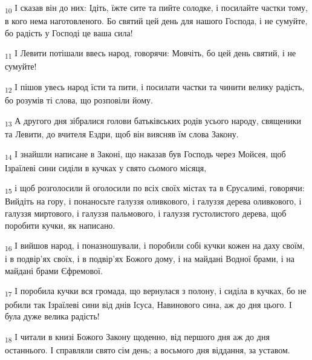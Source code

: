 \begin{tcolorbox}
\textsubscript{10} І сказав він до них: Ідіть, їжте сите та пийте солодке, і посилайте частки тому, в кого нема наготовленого. Бо святий цей день для нашого Господа, і не сумуйте, бо радість у Господі це ваша сила!
\end{tcolorbox}
\begin{tcolorbox}
\textsubscript{11} І Левити потішали ввесь народ, говорячи: Мовчіть, бо цей день святий, і не сумуйте!
\end{tcolorbox}
\begin{tcolorbox}
\textsubscript{12} І пішов увесь народ їсти та пити, і посилати частки та чинити велику радість, бо розумів ті слова, що розповіли йому.
\end{tcolorbox}
\begin{tcolorbox}
\textsubscript{13} А другого дня зібралися голови батьківських родів усього народу, священики та Левити, до вчителя Ездри, щоб він виясняв їм слова Закону.
\end{tcolorbox}
\begin{tcolorbox}
\textsubscript{14} І знайшли написане в Законі, що наказав був Господь через Мойсея, щоб Ізраїлеві сини сиділи в кучках у свято сьомого місяця,
\end{tcolorbox}
\begin{tcolorbox}
\textsubscript{15} і щоб розголосили й оголосили по всіх своїх містах та в Єрусалимі, говорячи: Вийдіть на гору, і понаносьте галуззя оливкового, і галуззя дерева оливкового, і галуззя миртового, і галуззя пальмового, і галуззя густолистого дерева, щоб поробити кучки, як написано.
\end{tcolorbox}
\begin{tcolorbox}
\textsubscript{16} І вийшов народ, і поназношували, і поробили собі кучки кожен на даху своїм, і в подвір'ях своїх, і в подвір'ях Божого дому, і на майдані Водної брами, і на майдані брами Єфремової.
\end{tcolorbox}
\begin{tcolorbox}
\textsubscript{17} І поробила кучки вся громада, що вернулася з полону, і сиділа в кучках, бо не робили так Ізраїлеві сини від днів Ісуса, Навинового сина, аж до дня цього. І була дуже велика радість!
\end{tcolorbox}
\begin{tcolorbox}
\textsubscript{18} І читали в книзі Божого Закону щоденно, від першого дня аж до дня останнього. І справляли свято сім день; а восьмого дня віддання, за уставом.
\end{tcolorbox}
